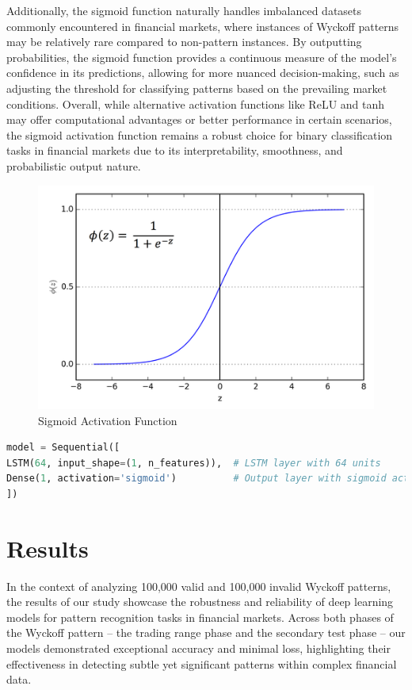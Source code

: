 \documentclass{article}
\begin{document}
Additionally, the sigmoid function naturally handles imbalanced datasets commonly encountered in financial markets, where instances of Wyckoff patterns may be relatively rare compared to non-pattern instances. By outputting probabilities, the sigmoid function provides a continuous measure of the model's confidence in its predictions, allowing for more nuanced decision-making, such as adjusting the threshold for classifying patterns based on the prevailing market conditions.
Overall, while alternative activation functions like ReLU and tanh may offer computational advantages or better performance in certain scenarios, the sigmoid activation function remains a robust choice for binary classification tasks in financial markets due to its interpretability, smoothness, and probabilistic output nature.

\begin{figure}[ht]
	\centering
	\includegraphics[width=0.45\linewidth]{visuals/sigmoid}
	\caption{Sigmoid Activation Function}
	\label{fig:sigmoid}
\end{figure}



\begin{lstlisting}[language=Python, caption={Creating the Model with Sigmoid Activation}]
model = Sequential([
LSTM(64, input_shape=(1, n_features)),  # LSTM layer with 64 units
Dense(1, activation='sigmoid')          # Output layer with sigmoid activation 
])
\end{lstlisting}


\section{Results}
In the context of analyzing 100,000 valid and 100,000 invalid Wyckoff patterns, the results of our study showcase the robustness and reliability of deep learning models for pattern recognition tasks in financial markets. Across both phases of the Wyckoff pattern – the trading range phase and the secondary test phase – our models demonstrated exceptional accuracy and minimal loss, highlighting their effectiveness in detecting subtle yet significant patterns within complex financial data.
\end{document}
